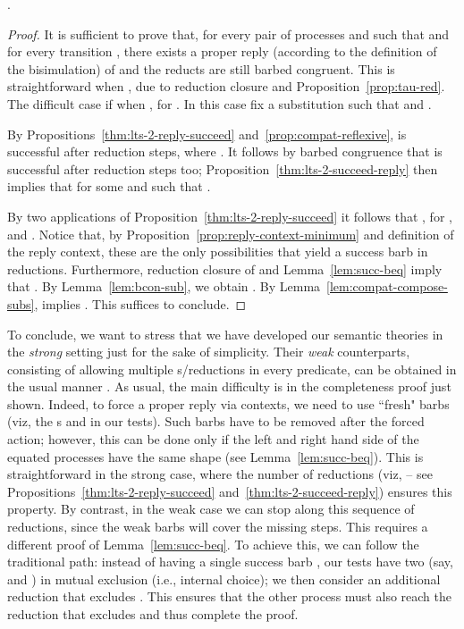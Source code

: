 \documentclass{LMCS}
\begin{document}
\begin{thm} 
\label{thm: complete}
.
\end{thm}
\begin{proof}
It is sufficient to prove that, for every pair of processes  and  such that  and
for every transition , there exists a proper reply (according to the definition of 
the bisimulation) of  and the reducts are still barbed congruent.
This is straightforward when , due to reduction closure and Proposition~\ref{prop:tau-red}.
The difficult case if when , for .
In this case fix a substitution  such that  and .

By Propositions~\ref{thm:lts-2-reply-succeed} and~\ref{prop:compat-reflexive},
 is successful after  reduction steps, where .
It follows by barbed congruence that  is successful after  reduction steps too;
Proposition~\ref{thm:lts-2-succeed-reply} then implies that 
for some  and  such that .

By two applications of Proposition~\ref{thm:lts-2-reply-succeed} it follows that
, for , and
.
Notice that, by Proposition~\ref{prop:reply-context-minimum} and definition of the reply context, 
these are the only possibilities that yield a success barb in  reductions.
Furthermore, reduction closure of  and Lemma~\ref{lem:succ-beq} imply that .
By Lemma~\ref{lem:bcon-sub}, we obtain .
By Lemma~\ref{lem:compat-compose-subs},  
implies . This suffices to conclude.
\end{proof}

To conclude, we want to stress that we have developed our semantic theories
in the {\em strong} setting just for the sake of simplicity. Their {\em weak} counterparts,
consisting of allowing multiple s/reductions in every predicate, can be obtained
in the usual manner \cite{milner.parrow.ea:calculus-mobile,milner.sangiorgi:barbed-bisimulation}.
As usual, the main difficulty is in the completeness proof just shown. Indeed, to force a proper
reply via contexts, we need to use ``fresh" barbs (viz, the s and  in our tests). Such barbs 
have to be removed after the forced action; however, this can be done only if the left and right
hand side of the equated processes have the same shape (see Lemma~\ref{lem:succ-beq}).
This is straightforward in the strong case, where the number of reductions (viz,  --
see Propositions~\ref{thm:lts-2-reply-succeed} and~\ref{thm:lts-2-succeed-reply}) ensures this property. 
By contrast, in the weak case we can stop along this sequence of  reductions, since the
weak barbs will cover the missing steps. This requires a different proof of Lemma~\ref{lem:succ-beq}.
To achieve this, we can follow the traditional path: instead of having a single success barb ,
our tests have two (say,  and ) in mutual exclusion (i.e., internal choice); we then 
consider an additional reduction that excludes . This ensures that the other process must also reach
the reduction that excludes  and thus complete the proof.
\end{document}
